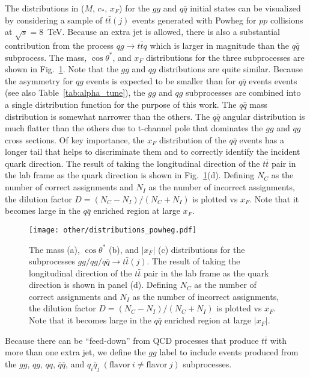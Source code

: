 \documentclass{cmspaperpdf}
\begin{document}
The distributions in ($M$, $c_*$, $x_F$) for the $gg$ and $q\bar q$ initial states can be visualized by considering a sample of $t\bar t(j)$ events generated with Powheg for $pp$ collisions at $\sqrt{s}=8$~TeV.  Because an extra jet is allowed, there is also a substantial contribution from the process $qg\to t\bar t q$ which is larger in magnitude than the $q\bar q$ subprocess.  The mass, $\cos\theta^*$, and $x_F$ distributions for the three subprocesses are shown in Fig.~\ref{fig:distributions}.  Note that the $gg$ and $qg$ distributions are quite similar.  Because the asymmetry for $qg$ events is expected to be smaller than for $q\bar q$ events events \cite{Kuhn:1998kw} (see also Table~\ref{tab:alpha_tune}), the $gg$ and $qg$ subprocesses are combined into a single distribution function for the purpose of this work.  The $q\bar q$ mass distribution is somewhat narrower than the others.  The $q\bar q$ angular distribution is much flatter than the others due to t-channel pole that dominates the $gg$ and $qg$ cross sections.  Of key importance, the $x_F$ distribution of the $q\bar q$ events has a longer tail that helps to discriminate them and to correctly identify the incident quark direction.  The result of taking the longitudinal direction of the $t\bar t$ pair in the lab frame as the quark direction is shown in Fig.~\ref{fig:distributions}(d).  Defining $N_C$ as the number of correct assignments and $N_I$ as the number of incorrect assignments, the dilution factor $D=(N_C-N_I)/(N_C+N_I)$ is plotted vs $x_F$.  Note that it becomes large in the $q\bar q$ enriched region at large $x_F$.
\begin{figure}[hbt]
  \begin{center}
    \texttt{[image: other/distributions\_powheg.pdf]}
  \caption{\small The mass (a), $\cos\theta^*$ (b), and $|x_F|$ (c) distributions for the subprocesses $gg/qg/q\bar q\to t\bar t(j)$.  The result of taking the longitudinal direction of the $t\bar t$ pair in the lab frame as the quark direction is shown in panel (d).  Defining $N_C$ as the number of correct assignments and $N_I$ as the number of incorrect assignments, the dilution factor $D=(N_C-N_I)/(N_C+N_I)$ is plotted vs $x_F$.  Note that it becomes large in the $q\bar q$ enriched region at large $|x_F|$.}
    \label{fig:distributions}
  \end{center}
\end{figure}

Because there can be ``feed-down'' from QCD processes that produce $t\bar t$ with more than one extra jet, we define the $gg$ label to include events produced from the $gg$, $qg$, $qq$, $\bar q \bar q$, and $q_i\bar q_j\ (\mathrm{flavor}\ i\neq \mathrm{flavor}\ j)$ subprocesses.
\end{document}
